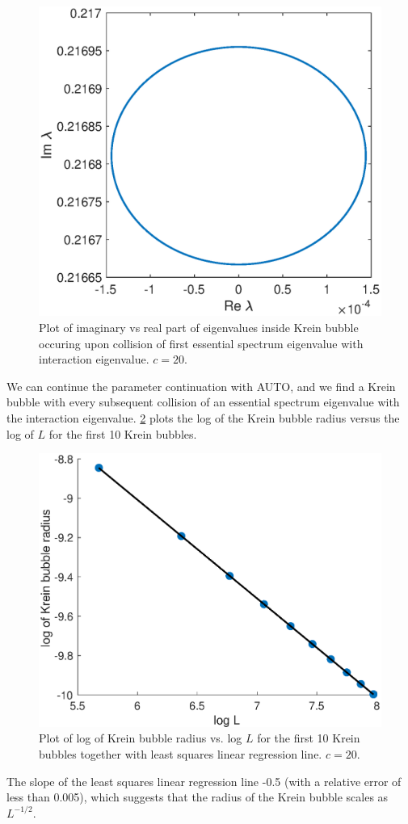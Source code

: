 \documentclass[thesis.tex]{subfiles}
\begin{document}
\begin{figure}[H]
\includegraphics[width=12cm]{images/kdv5numerics/kreinbubble1zoom}
\caption{Plot of imaginary vs real part of eigenvalues inside Krein bubble occuring upon collision of first essential spectrum eigenvalue with interaction eigenvalue. $c = 20$.}
\label{fig:kreinbubble1zoom}
\end{figure}

We can continue the parameter continuation with AUTO, and we find a Krein bubble with every subsequent collision of an essential spectrum eigenvalue with the interaction eigenvalue. \cref{fig:kreinbubbleradius} plots the log of the Krein bubble radius versus the log of $L$ for the first 10 Krein bubbles.

\begin{figure}[H]
\includegraphics[width=12cm]{images/kdv5numerics/kreinbubbleradius}
\caption{Plot of log of Krein bubble radius vs. log $L$ for the first 10 Krein bubbles together with least squares linear regression line. $c = 20$.}
\label{fig:kreinbubbleradius}
\end{figure}

The slope of the least squares linear regression line -0.5 (with a relative error of less than 0.005), which suggests that the radius of the Krein bubble scales as $L^{-1/2}$.

\iffulldocument\else
	
	
\fi
\end{document}
